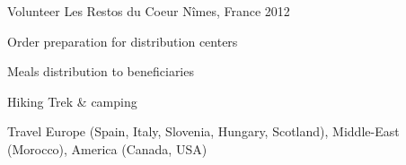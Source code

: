 

\begin{cventries}

  \cventry
    {Volunteer} %
    {Les Restos du Coeur} %
    {Nîmes, France} %
    {2012} %
    {
      \begin{cvitems} %
        \item {Order preparation for distribution centers}
        \item {Meals distribution to beneficiaries}
      \end{cvitems}
    }

\end{cventries}


\begin{cvhonors}

  \cvhonor
    {Hiking} %
    {Trek \& camping} %
    {} %
    {} %

  \cvhonor
    {Travel} %
    {Europe (Spain, Italy, Slovenia, Hungary, Scotland), Middle-East (Morocco), America (Canada, USA)} %
    {} %
    {} %
\end{cvhonors}